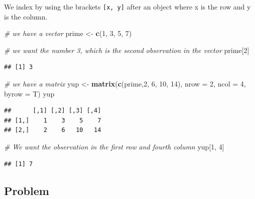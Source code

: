 \documentclass[
]{book}
\newenvironment{Shaded}{\begin{snugshade}}{\end{snugshade}}
\newcommand{\AttributeTok}[1]{\textcolor[rgb]{0.13,0.29,0.53}{#1}}
\newcommand{\CommentTok}[1]{\textcolor[rgb]{0.56,0.35,0.01}{\textit{#1}}}
\newcommand{\DecValTok}[1]{\textcolor[rgb]{0.00,0.00,0.81}{#1}}
\newcommand{\FunctionTok}[1]{\textcolor[rgb]{0.13,0.29,0.53}{\textbf{#1}}}
\newcommand{\NormalTok}[1]{#1}
\newcommand{\OtherTok}[1]{\textcolor[rgb]{0.56,0.35,0.01}{#1}}
\begin{document}
We index by using the brackets \texttt{{[}x,\ y{]}} after an object where x is the row and y is the column.

\begin{Shaded}
\begin{Highlighting}[]
\CommentTok{\# we have a vector}
\NormalTok{prime }\OtherTok{\textless{}{-}} \FunctionTok{c}\NormalTok{(}\DecValTok{1}\NormalTok{, }\DecValTok{3}\NormalTok{, }\DecValTok{5}\NormalTok{, }\DecValTok{7}\NormalTok{)}

\CommentTok{\# we want the number 3, which is the second observation in the vector}
\NormalTok{prime[}\DecValTok{2}\NormalTok{]}
\end{Highlighting}
\end{Shaded}

\begin{verbatim}
## [1] 3
\end{verbatim}

\begin{Shaded}
\begin{Highlighting}[]
\CommentTok{\# we have a matrix}
\NormalTok{yup }\OtherTok{\textless{}{-}} \FunctionTok{matrix}\NormalTok{(}\FunctionTok{c}\NormalTok{(prime,}\DecValTok{2}\NormalTok{, }\DecValTok{6}\NormalTok{, }\DecValTok{10}\NormalTok{, }\DecValTok{14}\NormalTok{), }\AttributeTok{nrow =} \DecValTok{2}\NormalTok{, }\AttributeTok{ncol =} \DecValTok{4}\NormalTok{, }\AttributeTok{byrow =}\NormalTok{ T)}
\NormalTok{yup}
\end{Highlighting}
\end{Shaded}

\begin{verbatim}
##      [,1] [,2] [,3] [,4]
## [1,]    1    3    5    7
## [2,]    2    6   10   14
\end{verbatim}

\begin{Shaded}
\begin{Highlighting}[]
\CommentTok{\# We want the observation in the first row and fourth column}
\NormalTok{yup[}\DecValTok{1}\NormalTok{, }\DecValTok{4}\NormalTok{]}
\end{Highlighting}
\end{Shaded}

\begin{verbatim}
## [1] 7
\end{verbatim}

\hypertarget{problem-4}{%
\subsection{Problem}\label{problem-4}}
\end{document}
